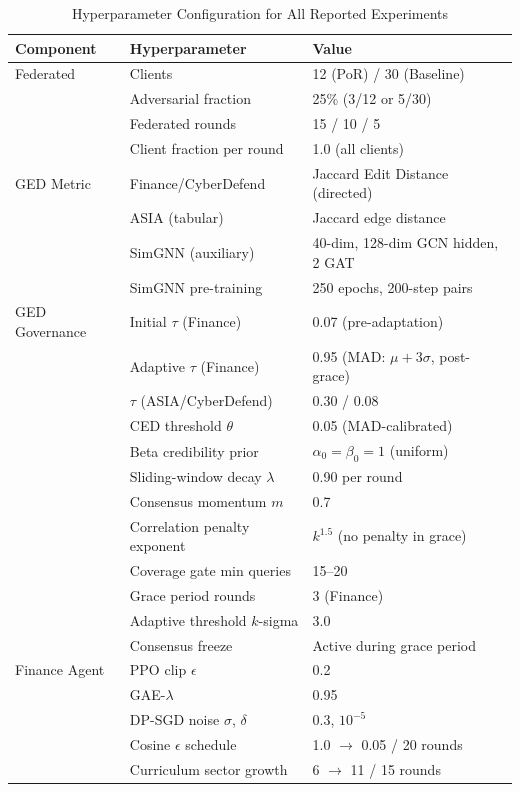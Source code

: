 \documentclass[journal]{IEEEtran}
\begin{document}
\begin{table}[t]
\centering
\footnotesize
\caption{Hyperparameter Configuration for All Reported Experiments}
\begin{tabular}{lll}
\hline
\textbf{Component} & \textbf{Hyperparameter} & \textbf{Value} \\
\hline
Federated & Clients & 12 (PoR) / 30 (Baseline) \\
 & Adversarial fraction & 25\% (3/12 or 5/30) \\
 & Federated rounds & 15 / 10 / 5 \\
 & Client fraction per round & 1.0 (all clients) \\
\hline
GED Metric & Finance/CyberDefend & Jaccard Edit Distance (directed) \\
 & ASIA (tabular) & Jaccard edge distance \\
 & SimGNN (auxiliary) & 40-dim, 128-dim GCN hidden, 2 GAT \\
 & SimGNN pre-training & 250 epochs, 200-step pairs \\
\hline
GED Governance & Initial $\tau$ (Finance) & 0.07 (pre-adaptation) \\
 & Adaptive $\tau$ (Finance) & 0.95 (MAD: $\mu+3\sigma$, post-grace) \\
 & $\tau$ (ASIA/CyberDefend) & 0.30 / 0.08 \\
 & CED threshold $\theta$ & 0.05 (MAD-calibrated) \\
 & Beta credibility prior & $\alpha_0{=}\beta_0{=}1$ (uniform) \\
 & Sliding-window decay $\lambda$ & 0.90 per round \\
 & Consensus momentum $m$ & 0.7 \\
 & Correlation penalty exponent & $k^{1.5}$ (no penalty in grace) \\
 & Coverage gate min queries & 15--20 \\
 & Grace period rounds & 3 (Finance) \\
 & Adaptive threshold $k$-sigma & 3.0 \\
 & Consensus freeze & Active during grace period \\
\hline
Finance Agent & PPO clip $\epsilon$ & 0.2 \\
 & GAE-$\lambda$ & 0.95 \\
 & DP-SGD noise $\sigma$, $\delta$ & 0.3, $10^{-5}$ \\
 & Cosine $\epsilon$ schedule & 1.0 $\to$ 0.05 / 20 rounds \\
 & Curriculum sector growth & 6 $\to$ 11 / 15 rounds \\

\end{tabular}
\end{table}
\end{document}
